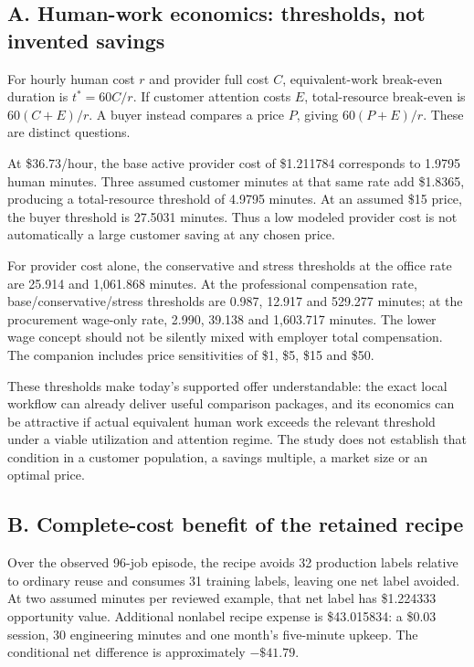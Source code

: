 \documentclass[11pt,letterpaper]{article}
\newcommand{\usd}[1]{\$#1}
\begin{document}
\subsection{A. Human-work economics: thresholds, not invented savings}

For hourly human cost $r$ and provider full cost $C$, equivalent-work break-even duration is $t^*=60C/r$. If customer attention costs $E$, total-resource break-even is $60(C+E)/r$. A buyer instead compares a price $P$, giving $60(P+E)/r$. These are distinct questions.

At \usd{36.73}/hour, the base active provider cost of \usd{1.211784} corresponds to 1.9795 human minutes. Three assumed customer minutes at that same rate add \usd{1.8365}, producing a total-resource threshold of 4.9795 minutes. At an assumed \usd{15} price, the buyer threshold is 27.5031 minutes. Thus a low modeled provider cost is not automatically a large customer saving at any chosen price.

For provider cost alone, the conservative and stress thresholds at the office rate are 25.914 and 1,061.868 minutes. At the professional compensation rate, base/conservative/stress thresholds are 0.987, 12.917 and 529.277 minutes; at the procurement wage-only rate, 2.990, 39.138 and 1,603.717 minutes. The lower wage concept should not be silently mixed with employer total compensation. The companion includes price sensitivities of \usd{1}, \usd{5}, \usd{15} and \usd{50}.

These thresholds make today's supported offer understandable: the exact local workflow can already deliver useful comparison packages, and its economics can be attractive if actual equivalent human work exceeds the relevant threshold under a viable utilization and attention regime. The study does not establish that condition in a customer population, a savings multiple, a market size or an optimal price.

\subsection{B. Complete-cost benefit of the retained recipe}

Over the observed 96-job episode, the recipe avoids 32 production labels relative to ordinary reuse and consumes 31 training labels, leaving one net label avoided. At two assumed minutes per reviewed example, that net label has \usd{1.224333} opportunity value. Additional nonlabel recipe expense is \usd{43.015834}: a \usd{0.03} session, 30 engineering minutes and one month's five-minute upkeep. The conditional net difference is approximately $-\usd{41.79}$.
\end{document}
